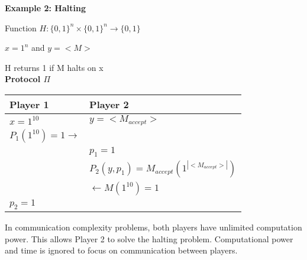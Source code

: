 \textbf{Example 2: Halting}
\\

\par{Function $H: \{0, 1\}^{n} \times \{0, 1\}^{n} \rightarrow \{0, 1\}$}
\\

\par{$x = 1^{n}$ and $y=<M>$}
\\

\par{H returns 1 if M halts on x}
\\

\textbf{Protocol $\Pi$}
\begin{center}
  \begin{tabular}{ |m{15em}|m{15em}| } 
    \hline
    Player 1                                  & Player 2 \\ [0.5ex] 
    \hline
    $x=1^{10}$                                & $y=<M_{accept}>$ \\
    $P_{1}(1^{10})= 1 \longrightarrow$        &  \\
                                              & $p_{1} = 1$ \\
                                              & $P_{2}(y, p_{1}) = M_{accept}(1^{|<M_{accept}>|})$ \\
                                              & $\longleftarrow M(1^{10}) = 1$ \\
    $p_{2} = 1$                               & \\
    \hline
  \end{tabular}
\end{center}

\par{In communication complexity problems, both players have unlimited computation power. This allows Player 2 to solve
the halting problem. Computational power and time is ignored to focus on communication between players.}